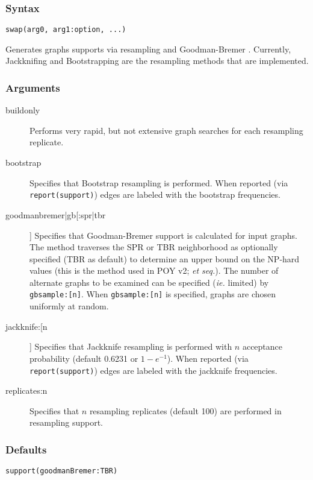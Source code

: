 	\subsubsection{Syntax}
		\texttt{swap(arg0, arg1:option, ...)}
		
	\begin{phygdescription}
		{Generates graphs supports via resampling \citep{Farrisetal1996} and Goodman-Bremer 
		\citep{Goodmanetal1982, bremer1994}. Currently, Jackknifing and Bootstrapping 
		are the resampling methods that are implemented.}
	\end{phygdescription}
		
	\subsubsection{Arguments}
		\begin{description}
			\item[buildonly] Performs very rapid, but not extensive graph searches for each 
			resampling replicate.
		
			\item[bootstrap] Specifies that Bootstrap resampling is performed. When reported 
			(via \texttt{report(support)}) edges are labeled with the bootstrap frequencies.
		
			\item[goodmanbremer|gb[:spr|tbr]] Specifies that Goodman-Bremer support is 
			calculated for input graphs. The method traverses the SPR or TBR neighborhood 
			as optionally specified (TBR as default) to determine an upper bound on the NP-hard 
			values (this is the method used in POY v2; \citealp{POY2} \textit{et seq.}). The number 
			of alternate graphs to be examined can be specified (\textit{ie.} limited) by \texttt{gbsample:[n]}. 
			When \texttt{gbsample:[n]} is specified, graphs are chosen uniformly at random.
		
			\item[jackknife:[n]] Specifies that Jackknife resampling is performed with $n$ acceptance 
			probability (default 0.6231 or $1 - e^{-1}$). When reported (via \texttt{report(support)}) 
			edges are labeled with the jackknife frequencies.
		
			\item[replicates:n] Specifies that $n$ resampling replicates (default 100) are performed 
			in resampling support.
		\end{description}	
		\subsubsection{Defaults}
			\texttt{support(goodmanBremer:TBR)}
		

